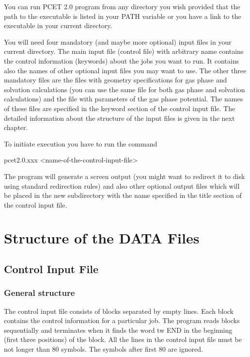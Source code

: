 \documentclass[oneside,11pt,openany]{book}
\newcommand{\tw}{\ttfamily}
\begin{document}
You can run PCET 2.0 program from any directory you wish provided
that the path to the executable is listed in your {\tw PATH}
variable or you have a link to the executable in your current
directory.

You will need four mandatory (and maybe more optional) input files
in your current directory. The main input file (control file)
with arbitrary name contains the control information
(keywords) about the jobs you want to run. It contains
also the names of other optional input files you may
want to use. The other three mandatory files are the files
with geometry specifications for gas phase and solvation
calculations (you can use the same file for both gas phase
and solvation calculations) and the file with parameters
of the gas phase potential. The names of these files are
specified in the keyword section of the control input file.
The detailed information about the structure of the input
files is given in the next chapter.

To initiate execution you have to run the command

\begin{description}
\item {\tw pcet2.0.xxx <name-of-the-control-input-file>}
\end{description}

The program will generate a screen output (you might want to
redirect it to disk using standard redirection rules) and
also other optional output files which will be placed
in the new subdirectory with the name specified in the title
section of the control input file.


\chapter{Structure of the DATA Files}

\section{Control Input File}

\subsection{General structure}
The control input file consists of blocks separated by
empty lines. Each block contains the control information
for a particular job. The program reads blocks sequentially
and terminates when it finds the word {tw END} in the
beginning (first three positions) of the block. All the
lines in the control input file must be not longer
than 80 symbols. The symbols after first 80 are ignored.
\end{document}
